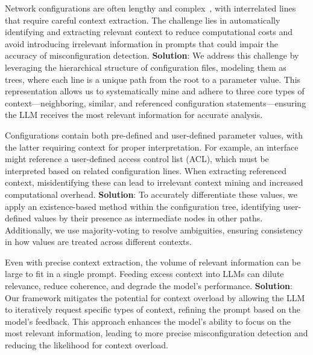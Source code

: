  Network
configurations are often lengthy and
complex~\cite{benson2009complexitymetrics}, with interrelated lines that
require careful context extraction. The challenge lies in automatically
identifying and extracting relevant context to reduce computational costs and
avoid introducing irrelevant information in prompts that could impair the accuracy of
misconfiguration detection. \textbf{Solution}: We address this challenge by
leveraging the hierarchical structure of configuration files, modeling them as
trees, where each line is a unique path from the root to a parameter value.
This representation allows us to systematically mine and adhere to three core types of
context---neighboring, similar, and referenced configuration
statements---ensuring the LLM receives the most relevant information for
accurate analysis.

Configurations contain both pre-defined and user-defined parameter values,
with the latter requiring context for proper interpretation. For example, an
interface might reference a user-defined access control list (ACL), which must
be interpreted based on related configuration lines. When extracting
referenced context, misidentifying these can lead to irrelevant context mining
and increased computational overhead. \textbf{Solution}: To accurately
differentiate these values, we apply an existence-based method within the
configuration tree, identifying user-defined values by their presence as
intermediate nodes in other paths. Additionally, we use majority-voting to
resolve ambiguities, ensuring consistency in how values are treated across
different contexts.

Even with precise context extraction, the volume of relevant information can
be large to fit in a single prompt. 
Feeding excess context into LLMs can dilute relevance, reduce coherence, and degrade the model’s performance.
\textbf{Solution}: Our framework mitigates the potential for context overload
by allowing the LLM to iteratively request specific types of context, refining
the prompt based on the model’s feedback. This approach enhances the model’s
ability to focus on the most relevant information, leading to more precise
misconfiguration detection and reducing the likelihood for context overload.

